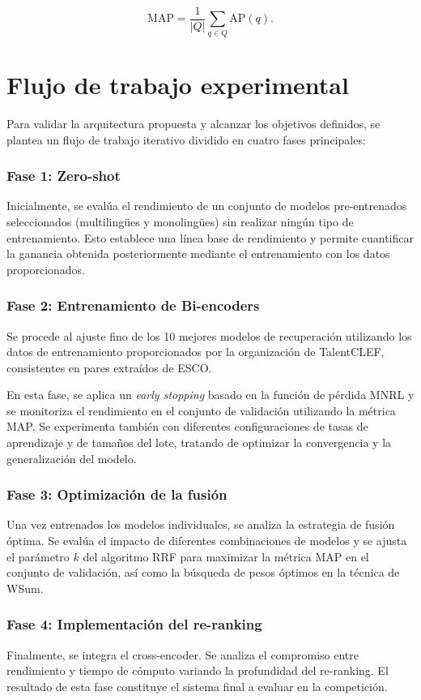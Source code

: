 \[
    \mathrm{MAP} = \frac{1}{|Q|} \sum_{q \in Q} \mathrm{AP}(q).
\]


\section{Flujo de trabajo experimental}

\noindent Para validar la arquitectura propuesta y alcanzar los objetivos definidos, se plantea un flujo de trabajo iterativo dividido en cuatro fases principales:

\subsubsection{Fase 1: Zero-shot}
\noindent Inicialmente, se evalúa el rendimiento de un conjunto de modelos pre-entrenados seleccionados (multilingües y monolingües) sin realizar ningún tipo de entrenamiento. Esto establece una línea base de rendimiento y permite cuantificar la ganancia obtenida posteriormente mediante el entrenamiento con los datos proporcionados.

\subsubsection{Fase 2: Entrenamiento de Bi-encoders}
\noindent Se procede al ajuste fino de los 10 mejores modelos de recuperación utilizando los datos de entrenamiento proporcionados por la organización de TalentCLEF, consistentes en pares extraídos de \gls{ESCO}. 

En esta fase, se aplica un \textit{early stopping} basado en la función de pérdida \gls{MNRL} y se monitoriza el rendimiento en el conjunto de validación utilizando la métrica \gls{MAP}. Se experimenta también con diferentes configuraciones de tasas de aprendizaje y de tamaños del lote, tratando de optimizar la convergencia y la generalización del modelo. 

\subsubsection{Fase 3: Optimización de la fusión}
\noindent Una vez entrenados los modelos individuales, se analiza la estrategia de fusión óptima. Se evalúa el impacto de diferentes combinaciones de modelos y se ajusta el parámetro $k$ del algoritmo \gls{RRF} para maximizar la métrica \gls{MAP} en el conjunto de validación, así como la búsqueda de pesos óptimos en la técnica de \gls{WSum}.

\subsubsection{Fase 4: Implementación del re-ranking}
\noindent Finalmente, se integra el cross-encoder. Se analiza el compromiso entre rendimiento y tiempo de cómputo variando la profundidad del re-ranking. El resultado de esta fase constituye el sistema final a evaluar en la competición.